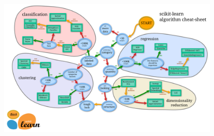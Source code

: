 \documentclass[8pt,dvipsnames]{beamer}
\begin{document}
\begin{frame}
	\begin{figure}
		\centering
		\includegraphics[width=\textwidth]{imgs/Basic_Practice_1.png}
	\end{figure}
\end{frame}
\end{document}
